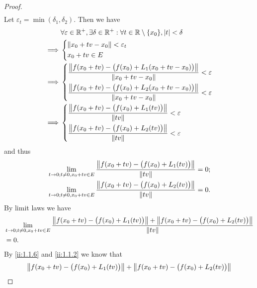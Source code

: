 \begin{proof}
\begin{align*}
  \end{align*}
  Let \(\varepsilon_t = \min(\delta_1, \delta_2)\).
  Then we have
  \begin{align*}
             & \forall \varepsilon \in \R^+, \exists \delta \in \R^+ : \forall t \in \R \setminus \set{x_0}, \abs{t} < \delta \\
    \implies & \begin{dcases}
                 \norm*{x_0 + tv - x_0} < \varepsilon_t \\
                 x_0 + tv \in E
               \end{dcases}                                                                         \\
    \implies & \begin{dcases}
                 \dfrac{\norm*{f(x_0 + tv) - \big(f(x_0) + L_1(x_0 + tv - x_0)\big)}}{\norm*{x_0 + tv - x_0}} < \varepsilon \\
                 \dfrac{\norm*{f(x_0 + tv) - \big(f(x_0) + L_2(x_0 + tv - x_0)\big)}}{\norm*{x_0 + tv - x_0}} < \varepsilon
               \end{dcases}                                           \\
    \implies & \begin{dcases}
                 \dfrac{\norm*{f(x_0 + tv) - \big(f(x_0) + L_1(tv)\big)}}{\norm*{tv}} < \varepsilon \\
                 \dfrac{\norm*{f(x_0 + tv) - \big(f(x_0) + L_2(tv)\big)}}{\norm*{tv}} < \varepsilon
               \end{dcases}
  \end{align*}
  and thus
  \begin{align*}
     & \lim_{t \to 0 ; t \neq 0, x_0 + tv \in E} \dfrac{\norm*{f(x_0 + tv) - \big(f(x_0) + L_1(tv)\big)}}{\norm*{tv}} = 0; \\
     & \lim_{t \to 0 ; t \neq 0, x_0 + tv \in E} \dfrac{\norm*{f(x_0 + tv) - \big(f(x_0) + L_2(tv)\big)}}{\norm*{tv}} = 0.
  \end{align*}
  By limit laws we have
  \begin{align*}
     & \lim_{t \to 0 ; t \neq 0, x_0 + tv \in E} \dfrac{\norm*{f(x_0 + tv) - \big(f(x_0) + L_1(tv)\big)} + \norm*{f(x_0 + tv) - \big(f(x_0) + L_2(tv)\big)}}{\norm*{tv}} \\
     & = 0.
  \end{align*}
  By \cref{ii:1.1.6} and \cref{ii:1.1.2} we know that
  \begin{align*}
     & \norm*{f(x_0 + tv) - \big(f(x_0) + L_1(tv)\big)} + \norm*{f(x_0 + tv) - \big(f(x_0) + L_2(tv)\big)}   \\

\end{align*}
\end{proof}
